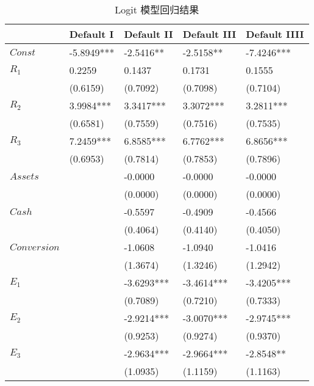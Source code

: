 \begin{table}
	\begin{center}
		\caption{Logit 模型回归结果\label{tab:Logitresult}}
		\begin{tabular}{lllll}
			\toprule
			                & Default I  & Default II & Default III & Default IIII \\
			\midrule
			\(Const\)       & -5.8949*** & -2.5416**  & -2.5158**   & -7.4246***   \\
			\(R_1\)         & 0.2259     & 0.1437     & 0.1731      & 0.1555       \\
			                & (0.6159)   & (0.7092)   & (0.7098)    & (0.7104)     \\
			\(R_2\)         & 3.9984***  & 3.3417***  & 3.3072***   & 3.2811***    \\
			                & (0.6581)   & (0.7559)   & (0.7516)    & (0.7535)     \\
			\(R_3\)         & 7.2459***  & 6.8585***  & 6.7762***   & 6.8656***    \\
			                & (0.6953)   & (0.7814)   & (0.7853)    & (0.7896)     \\
			\(Assets\)      &            & -0.0000    & -0.0000     & -0.0000      \\
			                &            & (0.0000)   & (0.0000)    & (0.0000)     \\
			\(Cash\)        &            & -0.5597    & -0.4909     & -0.4566      \\
			                &            & (0.4064)   & (0.4140)    & (0.4050)     \\
			\(Conversion\)  &            & -1.0608    & -1.0940     & -1.0416      \\
			                &            & (1.3674)   & (1.3246)    & (1.2942)     \\
			\(E_1\)         &            & -3.6293*** & -3.4614***  & -3.4205***   \\
			                &            & (0.7089)   & (0.7210)    & (0.7333)     \\
			\(E_2\)         &            & -2.9214*** & -3.0070***  & -2.9745***   \\
			                &            & (0.9253)   & (0.9274)    & (0.9370)     \\
			\(E_3\)         &            & -2.9634*** & -2.9664***  & -2.8548**    \\
			                &            & (1.0935)   & (1.1159)    & (1.1163)     \\

\end{tabular}
\end{center}
\end{table}
